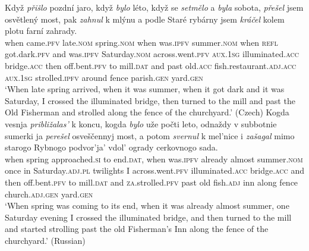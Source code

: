 \documentclass[output=paper,colorlinks,citecolor=brown]{langscibook}
\begin{document}
\ea\label{sommer}
\ea\label{sommera}	
\gll Když \textit{přišlo} pozdní jaro, když \textit{bylo} léto, když se \textit{setmělo} a \textit{byla} sobota, \textit{přešel} jsem osvětlený most, pak \textit{zahnul} k mlýnu a podle Staré rybárny jsem \textit{kráčel} kolem plotu farní zahrady.\\
when came.\textsc{pfv} late.\textsc{nom} spring.\textsc{nom} when was.\textsc{ipfv} summer.\textsc{nom} when \textsc{refl} got.dark.\textsc{pfv} and was.\textsc{ipfv} Saturday.\textsc{nom} across.went.\textsc{pfv} \textsc{aux.1sg} illuminated.\textsc{acc} bridge.\textsc{acc} then off.bent.\textsc{pfv} to mill.\textsc{dat} and past old.\textsc{acc} fish.restaurant.\textsc{adj.acc} \textsc{aux.1sg} strolled.\textsc{ipfv} around fence parish.\textsc{gen} yard.\textsc{gen}\\
\glt `When late spring arrived, when it was summer, when it got dark and it was Saturday, I crossed the illuminated bridge, then turned to the mill and past the Old Fisherman and strolled along the fence of the churchyard.' \hfill (Czech) %
\ex	
\gll Kogda vesnja \textit{približalas'} k koncu, kogda \textit{bylo} uže počti leto, odnaždy v subbotnie sumerki ja \textit{perešel} osveščennyj most, a potom \textit{svernul} k mel'nice i \textit{zašagal} mimo starogo  Rybnogo podvor'ja' vdol' ogrady cerkovnogo sada.\\
	when spring approached.\textsc{si} to end.\textsc{dat}, when was.\textsc{ipfv} already almost summer.\textsc{nom} once in Saturday.\textsc{adj.pl} twilights I across.went.\textsc{pfv} illuminated.\textsc{acc} bridge.\textsc{acc} and then off.bent.\textsc{pfv} to mill.\textsc{dat} and \textsc{za}.strolled.\textsc{pfv} past old {} fish.\textsc{adj} inn along fence church.\textsc{adj.gen} yard.\textsc{gen}\\
\glt `When spring was coming to its end, when it was already almost summer, one Saturday evening I crossed the illuminated bridge, and then turned to the mill and started strolling past the old Fisherman's Inn along the fence of the churchyard.' \hfill (Russian)
\z 
\z 
\end{document}
